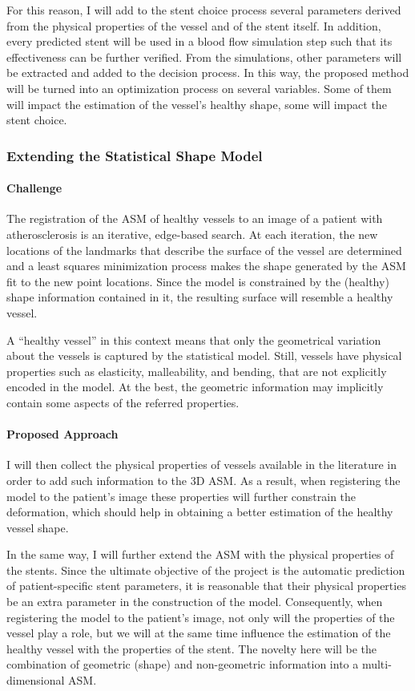 \documentclass[a4paper]{article}
\newcommand{\challenge}{\paragraph{Challenge}}
\newcommand{\approach}{\paragraph{Proposed Approach}}
\newcommand{\citep}{\cite}
\begin{document}
For this reason, I will add to the stent choice process several parameters derived from the physical properties of the vessel and of the stent itself. In addition, every predicted stent will be used in a blood flow simulation step such that its effectiveness can be further verified. From the simulations, other parameters will be extracted and added to the decision process. In this way, the proposed method will be turned into an optimization process on several variables. Some of them will impact the estimation of the vessel's healthy shape, some will impact the stent choice.

\subsubsection{Extending the Statistical Shape Model}

\challenge
The registration of the ASM of healthy vessels to an image of a patient with atherosclerosis is an iterative, edge-based search. At each iteration, the new locations of the landmarks that describe the surface of the vessel are determined and a least squares minimization process makes the shape generated by the ASM fit to the new point locations. Since the model is constrained by the (healthy) shape information contained in it, the resulting surface will resemble a healthy vessel.

A ``healthy vessel'' in this context means that only the geometrical variation about the vessels is captured by the statistical model. Still, vessels have physical properties such as elasticity, malleability, and bending, that are not explicitly encoded in the model. At the best, the geometric information may implicitly contain some aspects of the referred properties. 

\approach
I will then collect the physical properties of vessels available in the literature \citep{ZAHN-11d,BOUS-09c,BOUS-08c,SULA-08a,Oubel,zhang:1294,Balocco} in order to add such information to the 3D ASM. As a result, when registering the model to the patient's image these properties will further constrain the deformation, which should help in obtaining a better estimation of the healthy vessel shape. 

In the same way, I will further extend the ASM with the physical properties of the stents. Since the ultimate objective of the project is the automatic prediction of patient-specific stent parameters, it is reasonable that their physical properties be an extra parameter in the construction of the model. Consequently, when registering the model to the patient's image, not only will the properties of the vessel play a role, but we will at the same time influence the estimation of the healthy vessel with the properties of the stent. The novelty here will be the combination of geometric (shape) and non-geometric information into a multi-dimensional ASM. 
\end{document}
